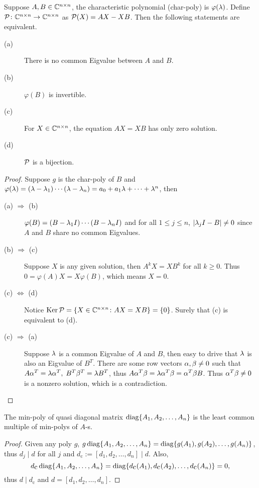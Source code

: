 \begin{pro}%
	Suppose $A,B\in\mathbb{C}^{n\times n}$, the characteristic polynomial (char-poly) is $\varphi(\lambda)$. Define $\mathcal{P}\colon \mathbb{C}^{n\times n}\to\mathbb{C}^{n\times n}$ as $\mathcal{P}(X)=AX-XB$. Then the following statements are equivalent.
	\begin{description}
	\item[(a)] There is no common Eigvalue between $A$ and $B$.
	\item[(b)] $\varphi(B)$ is invertible.
	\item[(c)] For $X\in\mathbb{C}^{n\times n}$, the equation $AX=XB$ has only zero solution.
	\item[(d)] $\mathcal{P}$ is a bijection.
	\end{description}
\end{pro}
\begin{proof}
	Suppose $g$ is the char-poly of $B$ and $\varphi(\lambda)=(\lambda-\lambda_1)\cdots(\lambda-\lambda_n)=a_0+a_1\lambda+\dots+\lambda^n$, then 
	\begin{description}
	\item [(a) $\Rightarrow$ (b)] $\varphi(B)=(B-\lambda_1I)\cdots(B-\lambda_nI)$ and for all $1\leq j\leq n$, $|\lambda_jI-B|\neq 0$ since $A$ and $B$ share no common Eigvalues. 
	\item [(b) $\Rightarrow$ (c)] Suppose $X$ is any given solution, then $A^k X=X B^k$ for all $k\geq 0$. Thus $0=\varphi(A)X=X\varphi(B)$, which means $X=0$.
	\item [(c) $\Leftrightarrow$ (d)] Notice $\operatorname*{Ker} \mathcal{P}=\{X\in\mathbb{C}^{n\times n}\colon AX=XB\}=\{0\}$. Surely that (c) is equivalent to (d).
	\item [(c) $\Rightarrow$ (a)] Suppose $\lambda$ is a common Eigvalue of $A$ and $B$, then easy to drive that $\lambda$ is also an Eigvalue of $B^T$. There are some row vectors $\alpha,\beta\neq 0$ such that $A\alpha^T=\lambda\alpha^T,\;B^T\beta^T=\lambda B^T$, thus $A\alpha^T\beta=\lambda\alpha^T\beta=\alpha^T\beta B$. Thus $\alpha^T\beta\neq 0$ is a nonzero solution, which is a contradiction.
	\end{description}
\end{proof}

\begin{pro} 
	The min-poly of quasi diagonal matrix $\operatorname*{diag}\{A_1,A_2,\dots,A_n\}$ is the least common multiple of min-polys of $A$-s.
\end{pro}
\begin{proof}
	Given any poly $g$, $g\operatorname*{diag}\{A_1,A_2,\dots,A_n\}=\operatorname*{diag}\{g(A_1),g(A_2),\dots,g(A_n)\}$, thus $d_j\mid d$ for all $j$ and $d_{\mbox{c}}:=[d_1,d_2,\dots,d_n]\mid d$. Also, 
	\[d_{\mbox{c}}\operatorname*{diag}\{A_1,A_2,\dots,A_n\}=\operatorname*{diag}\{d_{\mbox{c}}(A_1),d_{\mbox{c}}(A_2),\dots,d_{\mbox{c}}(A_n)\}=0,\] thus $d\mid d_{\mbox{c}}$ and $d=[d_1,d_2,\dots,d_n]$.
\end{proof} 

